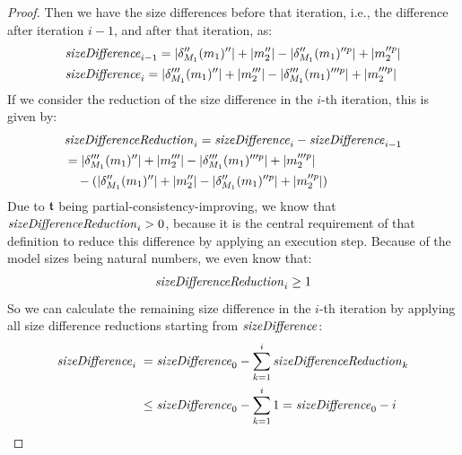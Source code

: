 \begin{proof}
    Then we have the size differences before that iteration, i.e., the difference after iteration $i-1$, and after that iteration, as:
    \begin{align*}
        &
        \mathit{sizeDifference}_{i-1} = \lvert\delta_{M_{1}}''(m_{1})''\rvert + \lvert m_{2}''\rvert - \lvert\delta_{M_{1}}''(m_{1})''^p\rvert + \lvert m_{2}''^p\rvert \\
        &
        \mathit{sizeDifference}_{i} = \lvert\delta_{M_{1}}'''(m_{1})''\rvert + \lvert m_{2}'''\rvert - \lvert\delta_{M_{1}}'''(m_{1})'''^p\rvert + \lvert m_{2}'''^p\rvert
    \end{align*}
    If we consider the reduction of the size difference in the $i$-th iteration, this is given by:
    \begin{align*}
        & 
        \mathit{sizeDifferenceReduction}_{i} = \mathit{sizeDifference}_{i} - \mathit{sizeDifference}_{i-1} \\
        & 
        = \lvert\delta_{M_{1}}'''(m_{1})''\rvert + \lvert m_{2}'''\rvert - \lvert\delta_{M_{1}}'''(m_{1})'''^p\rvert + \lvert m_{2}'''^p\rvert \\
        & \hspace{1em}
        - (\lvert\delta_{M_{1}}''(m_{1})''\rvert + \lvert m_{2}''\rvert - \lvert\delta_{M_{1}}''(m_{1})''^p\rvert + \lvert m_{2}''^p\rvert)
    \end{align*}
    Due to $\mathfrak{t}$ being partial-consistency-improving, we know that $\mathit{sizeDifferenceReduction}_{i} > 0$, because it is the central requirement of that definition to reduce this difference by applying an execution step. 
    Because of the model sizes being natural numbers, we even know that:
    \begin{align*}
        \mathit{sizeDifferenceReduction}_{i} \geq 1
    \end{align*}
    So we can calculate the remaining size difference in the $i$-th iteration by applying all size difference reductions starting from $\mathit{sizeDifference}$:
    \begin{align*}
        \mathit{sizeDifference}_{i} \; & 
        =  \mathit{sizeDifference}_{0} - \sum_{k=1}^{i} \mathit{sizeDifferenceReduction}_{k} \\
        &
        \leq \mathit{sizeDifference}_{0} - \sum_{k=1}^{i} 1 = \mathit{sizeDifference}_{0} - i
    \end{align*}

\end{proof}

